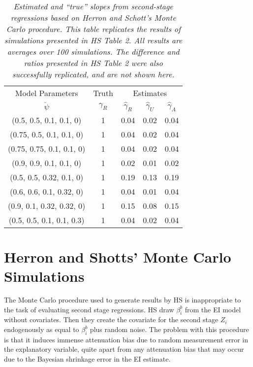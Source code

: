 \documentclass[11pt,titlepage]{article}
\begin{document}
\begin{table}[tb]
\label{t:hsrep}
\begin{center}
\begin{tabular}{cc|c c c}
Model Parameters & Truth & \multicolumn{3}{c}{Estimates} \\
$\breve\psi$  & $\gamma_R$ & $\hat\gamma_R$  &       $\hat\gamma_U$ & $\hat\gamma_A$ \\\hline
(0.5, 0.5, 0.1, 0.1, 0)&1 &       0.04    &       0.02    &       0.04        \\
(0.75, 0.5, 0.1, 0.1, 0) &1       &       0.04    &       0.02    &       0.04        \\
(0.75, 0.75, 0.1, 0.1, 0) &1      &       0.04    &       0.02    &       0.04     \\
(0.9, 0.9, 0.1, 0.1, 0) &1&       0.02    &       0.01    &       0.02          \\
(0.5, 0.5, 0.32, 0.1, 0) &1       &       0.19    &       0.13    &       0.19        \\
(0.6, 0.6, 0.1, 0.32, 0) &1       &       0.04    &       0.01    &       0.04     \\
(0.9, 0.1, 0.32, 0.32, 0)&1       &       0.15    &       0.08    &       0.15        \\
(0.5, 0.5, 0.1, 0.1, 0.3)&1       &       0.04    &       0.02    &       0.04     \\
\hline
\end{tabular}
\end{center}
\caption{\em Estimated and ``true'' slopes from 
second-stage regressions based on Herron and Schott's Monte Carlo 
procedure. This table replicates the results of simulations presented in
HS Table 2.  All results are averages over 100 simulations.  
The difference and ratios presented in HS Table 2 were also 
successfully replicated, and are not shown here.}
\end{table}

\section{Herron and Shotts' Monte Carlo Simulations}

The Monte Carlo procedure used to generate results by HS is
inappropriate to the task of evaluating second stage regressions.  HS
draw $\beta_i^b$ from the EI model without covariates.  Then they
create the covariate for the second stage $Z_i$ endogenously as equal
to $\beta_i^b$ plus random noise.  The problem with this procedure is
that it induces immense attenuation bias due to random measurement
error in the explanatory variable, quite apart from any attenuation
bias that may occur due to the Bayesian shrinkage error in the EI
estimate.
\end{document}
